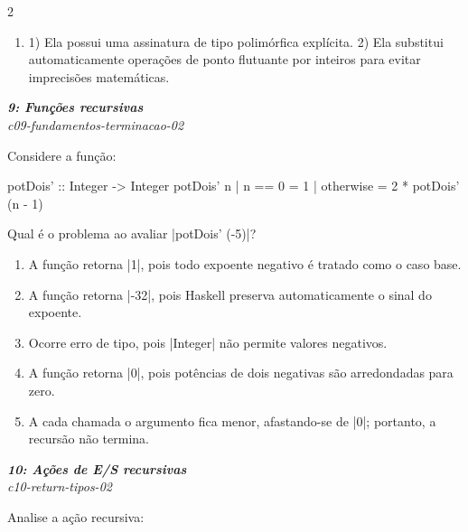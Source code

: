 \documentclass[a4paper,10pt,brazil]{article}
\begin{document}
\begin{multicols}{2}
\begin{enumerate}
  \item 1) Ela possui uma assinatura de tipo polimórfica explícita. 2) Ela substitui automaticamente operações de ponto flutuante por inteiros para evitar imprecisões matemáticas.


\end{enumerate}

\begin{flushright}
  \footnotesize
  \textit{\textbf{9: Funções recursivas}}\\
  \textit{c09-fundamentos-terminacao-02}\\

\end{flushright}
Considere a função:
\begin{haskellcode}
potDois' :: Integer -> Integer
potDois' n
  | n == 0    = 1
  | otherwise = 2 * potDois' (n - 1)
\end{haskellcode}
Qual é o problema ao avaliar \haskellinline|potDois' (-5)|?

\begin{enumerate}
  \item A função retorna \haskellinline|1|, pois todo expoente negativo é tratado como o caso base.

  \item A função retorna \haskellinline|-32|, pois Haskell preserva automaticamente o sinal do expoente.

  \item Ocorre erro de tipo, pois \haskellinline|Integer| não permite valores negativos.

  \item A função retorna \haskellinline|0|, pois potências de dois negativas são arredondadas para zero.

  \item A cada chamada o argumento fica menor, afastando-se de \haskellinline|0|; portanto, a recursão não termina.


\end{enumerate}

\begin{flushright}
  \footnotesize
  \textit{\textbf{10: Ações de E/S recursivas}}\\
  \textit{c10-return-tipos-02}\\

\end{flushright}
Analise a ação recursiva:


\end{multicols}
\end{document}
